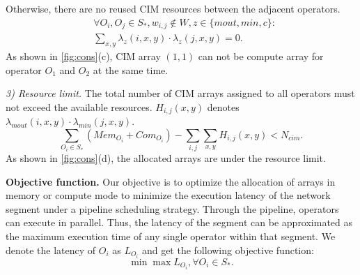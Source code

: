 Otherwise, there are no reused CIM resources between the adjacent operators. 
\begin{equation}
\begin{split}
    &\forall O_i,O_j \in S_*, w_{i,j} \notin W, z\in\{mout,min,c\}: \\
    &\textstyle \sum_{x,y} \lambda_{z}(i,x,y) \cdot \lambda_{z}(j,x,y) = 0 .
\end{split} 
\end{equation}
As shown in \fig \ref{fig:cons}(c), CIM array $(1,1)$ can not be compute array for operator $O_1$ and $O_2$ at the same time.

\textit{3) Resource limit.} The total number of CIM arrays assigned to all operators must not exceed the available resources. $H_{i,j}(x,y)$ denotes $\lambda_{mout}(i,x,y) \cdot \lambda_{min}(j,x,y)$. 
\begin{equation}
    \textstyle \sum_{O_i \in S_*}(Mem_{O_i}+Com_{O_i}) - \textstyle \sum_{i,j} \textstyle \sum_{x,y} H_{i,j}(x,y) < N_{cim}.
\end{equation}
As shown in \fig \ref{fig:cons}(d), the allocated arrays are under the resource limit.

\noindent\textbf{Objective function.}
Our objective is to optimize the allocation of arrays in memory or compute mode to minimize the execution latency of the network segment under a pipeline scheduling strategy. 
Through the pipeline, operators can execute in parallel.
Thus, the latency of the segment can be approximated as the maximum execution time of any single operator within that segment. 
We denote the latency of $O_i$ as $L_{O_i}$ and get the following objective function:
\begin{equation}
    \label{eq:objct}
    \min \max L_{O_i}, \forall O_i \in S_* .
\end{equation}

